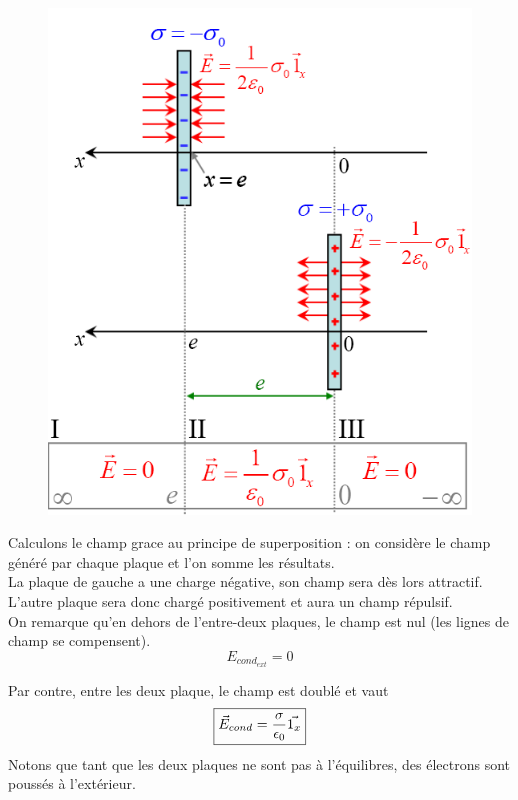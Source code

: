 \documentclass	[11pt, a4paper, openany]{book}
\begin{document}
\begin{figure}
	\includegraphics[scale=0.44]{es/image15.png}
\end{figure}
Calculons le champ grace au principe de superposition : on considère le champ généré par chaque plaque et l'on somme les résultats.\\
La plaque de gauche a une charge négative, son champ sera dès lors attractif. L'autre plaque sera donc chargé positivement et aura un champ répulsif.\\
On remarque qu'en dehors de l'entre-deux plaques, le champ est nul (les lignes de champ se compensent).
\begin{equation}
	E_{cond_{ext}} = 0
\end{equation}

Par contre, entre les deux plaque, le champ est doublé et vaut
\begin{equation}
	\fbox{$\vec{E}_{cond} = \dfrac{\sigma}{\epsilon_0}\vec{1_x}$}
\end{equation}
Notons que tant que les deux plaques ne sont pas à l'équilibres, des électrons sont poussés à l'extérieur.\\
\end{document}
